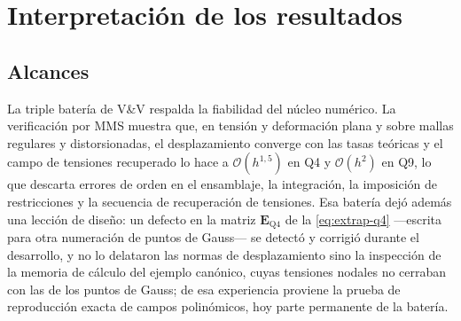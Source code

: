 \section{Interpretación de los resultados}
\label{sec:interpretacion}

\subsection{Alcances}

La triple batería de V\&V respalda la fiabilidad del núcleo numérico. La verificación por MMS muestra que, en tensión y deformación plana y sobre mallas regulares y distorsionadas, el desplazamiento converge con las tasas teóricas y el campo de tensiones recuperado lo hace a $\mathcal{O}(h^{1{,}5})$ en Q4 y $\mathcal{O}(h^{2})$ en Q9, lo que descarta errores de orden en el ensamblaje, la integración, la imposición de restricciones y la secuencia de recuperación de tensiones. Esa batería dejó además una lección de diseño: un defecto en la matriz $\bm{E}_{\text{Q4}}$ de la \autoref{eq:extrap-q4} —escrita para otra numeración de puntos de Gauss— se detectó y corrigió durante el desarrollo, y no lo delataron las normas de desplazamiento sino la inspección de la memoria de cálculo del ejemplo canónico, cuyas tensiones nodales no cerraban con las de los puntos de Gauss; de esa experiencia proviene la prueba de reproducción exacta de campos polinómicos, hoy parte permanente de la batería.

